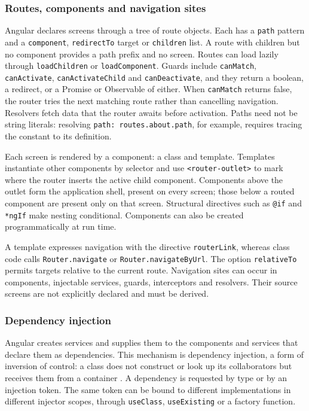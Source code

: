 

\subsubsection{Routes, components and navigation sites}

Angular declares screens through a tree of route objects. Each has a \texttt{path} pattern
and a \texttt{component}, \texttt{redirectTo} target or \texttt{children} list. A route with
children but no component provides a path prefix and no screen. Routes can load lazily through
\texttt{loadChildren} or \texttt{loadComponent}. Guards include \texttt{canMatch},
\texttt{canActivate}, \texttt{canActivateChild} and \texttt{canDeactivate}, and they return a
boolean, a redirect, or a Promise or Observable of either. When \texttt{canMatch} returns false,
the router tries the next matching route rather than cancelling navigation. Resolvers fetch
data that the router awaits before activation. Paths need not be string literals: resolving
\texttt{path: routes.about.path}, for example, requires tracing the constant to its definition.

Each screen is rendered by a component: a class and template. Templates instantiate other
components by selector and use \texttt{<router-outlet>} to mark where the router inserts the
active child component. Components above the outlet form the application shell, present on
every screen; those below a routed component are present only on that screen. Structural
directives such as \texttt{@if} and \texttt{*ngIf} make nesting conditional. Components can
also be created programmatically at run time.

A template expresses navigation with the directive \texttt{routerLink}, whereas class code
calls \texttt{Router.navigate} or \texttt{Router.navigateByUrl}. The option \texttt{relativeTo}
permits targets relative to the current route. Navigation sites can occur in components,
injectable services, guards, interceptors and resolvers. Their source screens are not
explicitly declared and must be derived.

\subsubsection{Dependency injection}
\label{sec:di}

Angular creates services and supplies them to the components and services that declare them as
dependencies. This mechanism is dependency injection, a form of inversion of control: a class does
not construct or look up its collaborators but receives them from a container
\cite{johnson1988reusable,fowler2004injection}. A dependency is requested by type or by an
injection token. The same token can be bound to different implementations in different injector
scopes, through \texttt{useClass}, \texttt{useExisting} or a factory function.


